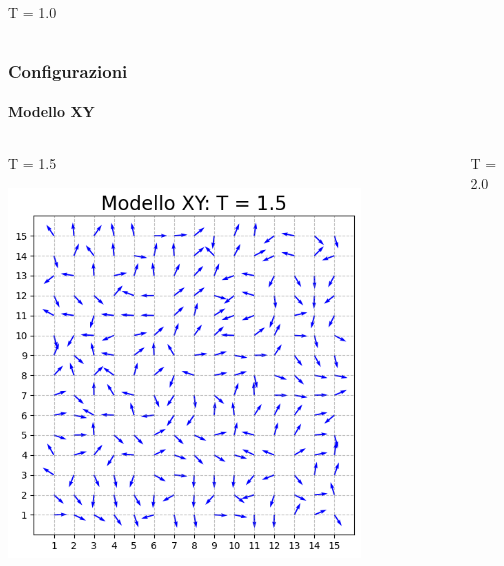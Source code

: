\begin{frame}
\begin{columns}
\begin{column}{0.5\textwidth}
\begin{block}{T = 1.0}
            \end{block}
        \end{column}
    \end{columns}

\end{frame}



\begin{frame}
    \frametitle{Configurazioni}
    \framesubtitle{Modello XY}

    \begin{columns}
        \begin{column}{0.5\textwidth}
            \begin{block}{T = 1.5}

            \centering
            \includegraphics[width=0.8\textwidth]{Immagini/backupXY/conf_T1.5.png}

            \end{block}
        \end{column}
    
        \begin{column}{0.5\textwidth}
            \begin{block}{T = 2.0}


\end{block}
\end{column}
\end{columns}
\end{frame}
